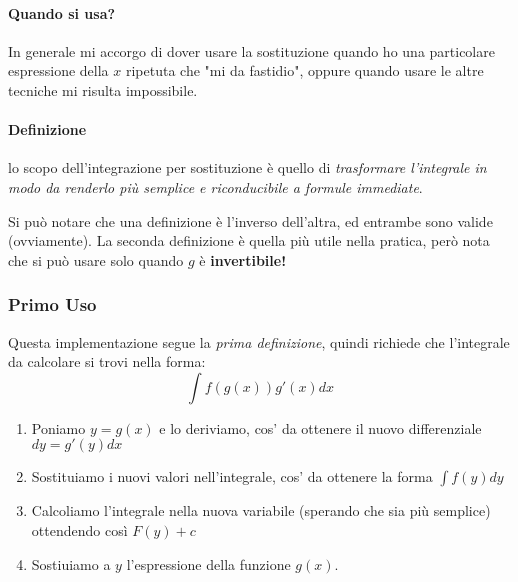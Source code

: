 \paragraph{Quando si usa?} 
In generale mi accorgo di dover usare la sostituzione quando ho una particolare espressione della $x$ ripetuta che "mi da fastidio", 
oppure quando usare le altre tecniche mi risulta impossibile.

\paragraph*{Definizione} lo scopo dell'integrazione per sostituzione è quello di \emph{trasformare l'integrale in modo da renderlo più semplice e riconducibile a formule immediate}.

Si può notare che una definizione è l'inverso dell'altra, ed entrambe sono valide (ovviamente).
La seconda definizione è quella più utile nella pratica, però nota che si può usare solo quando $g$ è \textbf{invertibile!}  

\subsubsection*{Primo Uso}
Questa implementazione segue la \emph{prima definizione}, quindi richiede che l'integrale da calcolare si trovi nella forma:
$$\int f(g(x)) g'(x) dx$$
\begin{enumerate}
	\item Poniamo $y=g(x)$ e lo deriviamo, cos' da ottenere il nuovo differenziale $dy = g'(y)dx$
	\item Sostituiamo i nuovi valori nell'integrale, cos' da ottenere la forma $\int f(y) dy$
	\item Calcoliamo l'integrale nella nuova variabile (sperando che sia più semplice) ottendendo così $F(y) + c$
	\item Sostiuiamo a $y$ l'espressione della funzione $g(x)$.
\end{enumerate}

